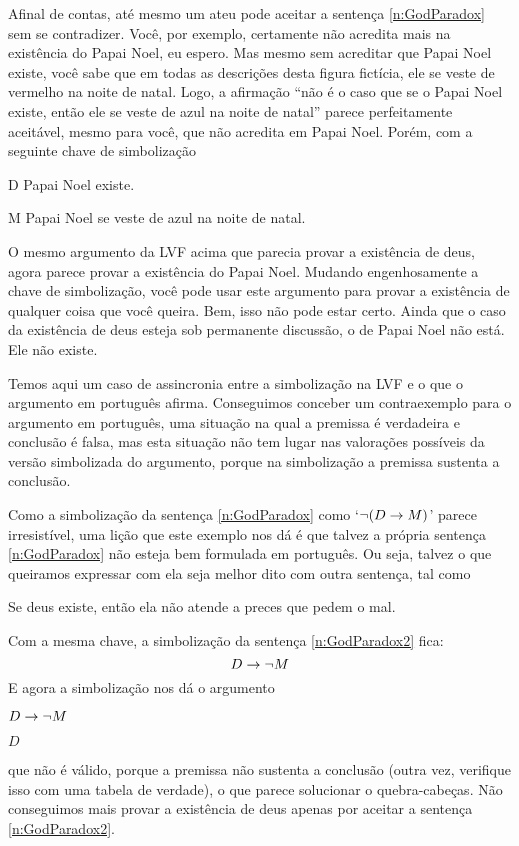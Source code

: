 Afinal de contas, até mesmo um ateu pode aceitar a sentença \ref{n:GodParadox} sem se contradizer.
Você, por exemplo, certamente não acredita mais na existência do Papai Noel, eu espero.
Mas mesmo sem acreditar que Papai Noel existe, você sabe que em todas as descrições desta figura fictícia, ele se veste de vermelho na noite de natal.
Logo, a afirmação ``não é o caso que se o Papai Noel existe, então ele se veste de azul na noite de natal'' parece perfeitamente aceitável, mesmo para você, que não acredita em Papai Noel.
Porém, com a seguinte chave de simbolização
\begin{ekey}
	\item[D] Papai Noel existe.
	\item[M] Papai Noel se veste de azul na noite de natal.
\end{ekey}
O mesmo argumento da LVF acima que parecia provar a existência de deus, agora parece provar a existência do Papai Noel.
Mudando engenhosamente a chave de simbolização, você pode usar este argumento para provar a existência de qualquer coisa que você queira.
Bem, isso não pode estar certo.
Ainda que o caso da existência de deus esteja sob permanente discussão, o de Papai Noel não está. Ele não existe. %

Temos aqui um caso de assincronia entre a simbolização na LVF e o que o argumento em português afirma.
Conseguimos conceber um contraexemplo para o argumento em português, uma situação na qual a premissa é verdadeira e conclusão é falsa, mas esta situação não tem lugar nas valorações possíveis da versão simbolizada do argumento, porque na simbolização a premissa sustenta a conclusão.

Como a simbolização da sentença \ref{n:GodParadox} como `$\neg (D \rightarrow M)$' parece irresistível, uma lição que este exemplo nos dá é que talvez a própria sentença \ref{n:GodParadox} não esteja bem formulada em português.
Ou seja, talvez o que queiramos expressar com ela seja melhor dito com outra sentença, tal como
        	\begin{earg}
                  \setcounter{eargnum}{3}	
                \item\label{n:GodParadox2} Se deus existe, então ela não atende a preces que pedem o mal.
  \end{earg}
Com a mesma chave, a simbolização da sentença \ref{n:GodParadox2} fica:
$$D \rightarrow \neg M$$
E agora a simbolização nos dá o argumento
	\begin{earg}
		\item[] $D \rightarrow \neg M$
		\item[\therefore] $D$
	\end{earg}
que não é válido, porque a premissa não sustenta a conclusão (outra vez, verifique isso com uma tabela de verdade), o que parece solucionar o quebra-cabeças.
Não conseguimos mais provar a existência de deus apenas por aceitar a sentença  \ref{n:GodParadox2}.

